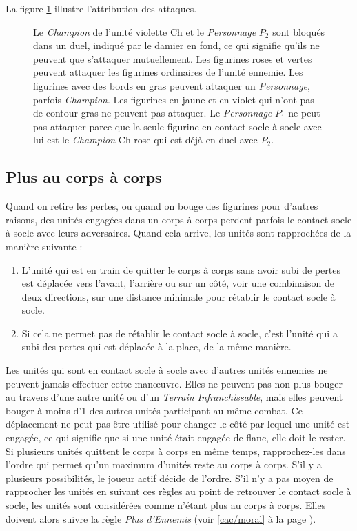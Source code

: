 La figure \ref{figure/attribution} illustre l'attribution des attaques.

\begin{figure}[!htbp]
\centering
\def\svgwidth{8cm}

\caption{Le \emph{Champion} de l'unité violette Ch et le \emph{Personnage} $ P_{2} $ sont bloqués dans un duel, indiqué par le damier en fond, ce qui signifie qu'ils ne peuvent que s'attaquer mutuellement. Les figurines roses et vertes peuvent attaquer les figurines ordinaires de l'unité ennemie. Les figurines avec des bords en gras peuvent attaquer un \emph{Personnage}, parfois \emph{Champion}. Les figurines en jaune et en violet qui n'ont pas de contour gras ne peuvent pas attaquer. Le \emph{Personnage} $ P_{1} $ ne peut pas attaquer parce que la seule figurine en contact socle à socle avec lui est le \emph{Champion} Ch rose qui est déjà en duel avec $ P_{2} $.}
\label{figure/attribution}
\end{figure}

\subsection{Plus au corps à corps}

Quand on retire les pertes, ou quand on bouge des figurines pour d'autres raisons, des unités engagées dans un corps à corps perdent parfois le contact socle à socle avec leurs adversaires. Quand cela arrive, les unités sont rapprochées de la manière suivante :
\begin{enumerate}
\item L'unité qui est en train de quitter le corps à corps sans avoir subi de pertes est déplacée vers l'avant, l'arrière ou sur un côté, voir une combinaison de deux directions, sur une distance minimale pour rétablir le contact socle à socle.
\item Si cela ne permet pas de rétablir le contact socle à socle, c'est l'unité qui a subi des pertes qui est déplacée à la place, de la même manière.
\end{enumerate}

Les unités qui sont en contact socle à socle avec d'autres unités ennemies ne peuvent jamais effectuer cette manœuvre. Elles ne peuvent pas non plus bouger au travers d'une autre unité ou d'un \emph{Terrain Infranchissable}, mais elles peuvent bouger à moins d'\unit{1}{\pouce} des autres unités participant au même combat. Ce déplacement ne peut pas être utilisé pour changer le côté par lequel une unité est engagée, ce qui signifie que si une unité était engagée de flanc, elle doit le rester. Si plusieurs unités quittent le corps à corps en même temps, rapprochez-les dans l'ordre qui permet qu'un maximum d'unités reste au corps à corps. S'il y a plusieurs possibilités, le joueur actif décide de l'ordre. S'il n'y a pas moyen de rapprocher les unités en suivant ces règles au point de retrouver le contact socle à socle, les unités sont considérées comme n'étant plus au corps à corps. Elles doivent alors suivre la règle  \emph{Plus d'Ennemis} (voir \ref{cac/moral} à la page \pageref{cac/moral}).

